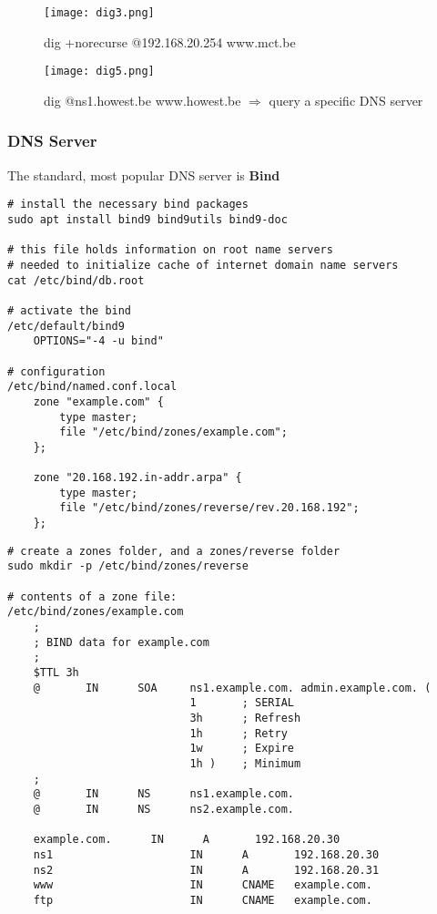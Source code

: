 \documentclass{article}
\begin{document}
\begin{figure}[H]
    \centering
    \texttt{[image: dig3.png]}
    \caption{dig +norecurse @192.168.20.254 www.mct.be}
\end{figure}

\begin{figure}[H]
    \centering
    \texttt{[image: dig5.png]}
    \caption{dig @ns1.howest.be www.howest.be $\Rightarrow$ query a specific DNS server}
\end{figure}

\subsubsection{DNS Server}

The standard, most popular DNS server is \textbf{Bind}

\begin{verbatim}
# install the necessary bind packages
sudo apt install bind9 bind9utils bind9-doc

# this file holds information on root name servers
# needed to initialize cache of internet domain name servers
cat /etc/bind/db.root

# activate the bind
/etc/default/bind9
    OPTIONS="-4 -u bind"

# configuration
/etc/bind/named.conf.local 
    zone "example.com" {
        type master;
        file "/etc/bind/zones/example.com";
    };

    zone "20.168.192.in-addr.arpa" {
        type master;
        file "/etc/bind/zones/reverse/rev.20.168.192";
    };

\end{verbatim}

\begin{verbatim}
# create a zones folder, and a zones/reverse folder
sudo mkdir -p /etc/bind/zones/reverse

# contents of a zone file:
/etc/bind/zones/example.com
    ;
    ; BIND data for example.com
    ;
    $TTL 3h
    @       IN      SOA     ns1.example.com. admin.example.com. (
                            1       ; SERIAL
                            3h      ; Refresh
                            1h      ; Retry
                            1w      ; Expire
                            1h )    ; Minimum
    ;
    @       IN      NS      ns1.example.com.
    @       IN      NS      ns2.example.com.

    example.com.      IN      A       192.168.20.30
    ns1                     IN      A       192.168.20.30
    ns2                     IN      A       192.168.20.31
    www                     IN      CNAME   example.com.
    ftp                     IN      CNAME   example.com.
\end{verbatim}
\end{document}

